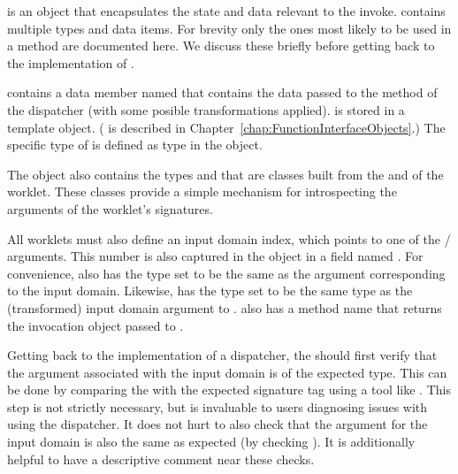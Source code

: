 

 is an object that encapsulates the state and data relevant to the invoke.
 contains multiple types and data items.
For brevity only the ones most likely to be used in a  method are documented here.
We discuss these briefly before getting back to the implementation of .

 contains a data member named  that contains the data passed to the  method of the dispatcher (with some posible transformations applied).
 is stored in a  template object.
( is described in Chapter~\ref{chap:FunctionInterfaceObjects}.)
The specific type of  is defined as type  in the  object.

The  object also contains the types  and  that are  classes built from the \controlsignature and \executionsignature of the worklet.
These  classes provide a simple mechanism for introspecting the arguments of the worklet's signatures.

All worklets must also define an input domain index, which points to one of the \controlsignature/ arguments.
This number is also captured in the  object in a field named .
For convenience,  also has the type  set to be the same as the \controlsignature argument corresponding to the input domain.
Likewise,  has the type  set to be the same type as the (transformed) input domain argument to .
 also has a method name  that returns the invocation object passed to .


Getting back to the implementation of a dispatcher, the  should first verify that the \controlsignature argument associated with the input domain is of the expected type.
This can be done by comparing the  with the expected signature tag using a tool like .
This step is not strictly necessary, but is invaluable to users diagnosing issues with using the dispatcher.
It does not hurt to also check that the  argument for the input domain is also the same as expected (by checking ).
It is additionally helpful to have a descriptive comment near these checks.

